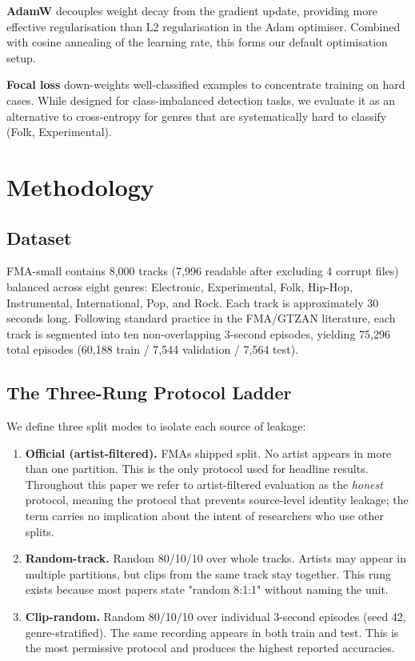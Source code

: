 \documentclass[conference]{IEEEtran}
\begin{document}
\textbf{AdamW} \citep{loshchilov2019adamw} decouples weight decay from
the gradient update, providing more effective regularisation than L2
regularisation in the Adam optimiser. Combined with cosine annealing of
the learning rate, this forms our default optimisation setup.

\textbf{Focal loss} \citep{lin2017focal} down-weights well-classified
examples to concentrate training on hard cases. While designed for
class-imbalanced detection tasks, we evaluate it as an alternative to
cross-entropy for genres that are systematically hard to classify (Folk,
Experimental).

\section{Methodology}\label{methodology}

\subsection{Dataset}\label{a.-dataset}

FMA-small \citep{defferrard2017fma} contains 8,000 tracks (7,996
readable after excluding 4 corrupt files) balanced across eight genres:
Electronic, Experimental, Folk, Hip-Hop, Instrumental, International,
Pop, and Rock. Each track is approximately 30 seconds long. Following
standard practice in the FMA/GTZAN literature, each track is segmented
into ten non-overlapping 3-second episodes, yielding 75,296 total
episodes (60,188 train / 7,544 validation / 7,564 test).

\subsection{The Three-Rung Protocol
Ladder}\label{b.-the-three-rung-protocol-ladder}

We define three split modes to isolate each source of leakage:

\begin{enumerate}
\def\labelenumi{\arabic{enumi}.}
\item
  \textbf{Official (artist-filtered).} FMA\textquotesingle s shipped
  split. No artist appears in more than one partition. This is the only
  protocol used for headline results. Throughout this paper we refer to
  artist-filtered evaluation as the \emph{honest} protocol, meaning the
  protocol that prevents source-level identity leakage; the term carries
  no implication about the intent of researchers who use other splits.
\item
  \textbf{Random-track.} Random 80/10/10 over whole tracks. Artists may
  appear in multiple partitions, but clips from the same track stay
  together. This rung exists because most papers state "random 8:1:1"
  without naming the unit.
\item
  \textbf{Clip-random.} Random 80/10/10 over individual 3-second
  episodes (seed 42, genre-stratified). The same recording appears in
  both train and test. This is the most permissive protocol and produces
  the highest reported accuracies.
\end{enumerate}
\end{document}
